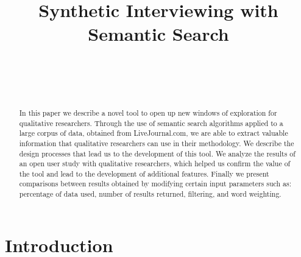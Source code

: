 \documentclass{sigchi}
\def\plaintitle{Synthetic Interviewing with Semantic Search}
\begin{document}
\title{\plaintitle}

\author{%
  \\
  \\
  \\
}

\maketitle

\begin{abstract}
  In this paper we describe a novel tool to open up new windows of exploration for qualitative researchers. Through the use of semantic search algorithms applied to a large corpus of data, obtained from LiveJournal.com, we are able to extract valuable information that qualitative researchers can use in their methodology. We describe the design processes that lead us to the development of this tool. We analyze the results of an open user study with qualitative researchers, which helped us confirm the value of the tool and lead to the development of additional features. Finally we present comparisons between results obtained by modifying certain input parameters such as: percentage of data used, number of results returned, filtering, and word weighting.
\end{abstract}

 


\section{Introduction}
\end{document}
